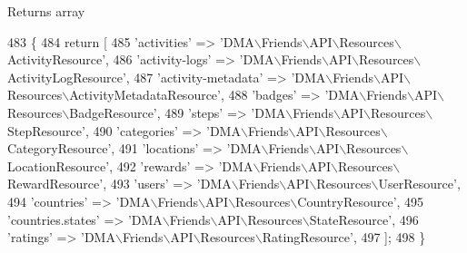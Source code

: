 \begin{DoxyReturn}{Returns}
array 
\end{DoxyReturn}

\begin{DoxyCode}
483     \{
484         \textcolor{keywordflow}{return} [
485             \textcolor{stringliteral}{'activities'}            => \textcolor{stringliteral}{'DMA\(\backslash\)Friends\(\backslash\)API\(\backslash\)Resources\(\backslash\)ActivityResource'},
486             \textcolor{stringliteral}{'activity-logs'}         => \textcolor{stringliteral}{'DMA\(\backslash\)Friends\(\backslash\)API\(\backslash\)Resources\(\backslash\)ActivityLogResource'},
487             \textcolor{stringliteral}{'activity-metadata'}     => \textcolor{stringliteral}{'DMA\(\backslash\)Friends\(\backslash\)API\(\backslash\)Resources\(\backslash\)ActivityMetadataResource'},
488             \textcolor{stringliteral}{'badges'}                => \textcolor{stringliteral}{'DMA\(\backslash\)Friends\(\backslash\)API\(\backslash\)Resources\(\backslash\)BadgeResource'},
489             \textcolor{stringliteral}{'steps'}                 => \textcolor{stringliteral}{'DMA\(\backslash\)Friends\(\backslash\)API\(\backslash\)Resources\(\backslash\)StepResource'},
490             \textcolor{stringliteral}{'categories'}            => \textcolor{stringliteral}{'DMA\(\backslash\)Friends\(\backslash\)API\(\backslash\)Resources\(\backslash\)CategoryResource'},
491             \textcolor{stringliteral}{'locations'}             => \textcolor{stringliteral}{'DMA\(\backslash\)Friends\(\backslash\)API\(\backslash\)Resources\(\backslash\)LocationResource'},
492             \textcolor{stringliteral}{'rewards'}               => \textcolor{stringliteral}{'DMA\(\backslash\)Friends\(\backslash\)API\(\backslash\)Resources\(\backslash\)RewardResource'},
493             \textcolor{stringliteral}{'users'}                 => \textcolor{stringliteral}{'DMA\(\backslash\)Friends\(\backslash\)API\(\backslash\)Resources\(\backslash\)UserResource'},
494             \textcolor{stringliteral}{'countries'}             => \textcolor{stringliteral}{'DMA\(\backslash\)Friends\(\backslash\)API\(\backslash\)Resources\(\backslash\)CountryResource'},   
495             \textcolor{stringliteral}{'countries.states'}      => \textcolor{stringliteral}{'DMA\(\backslash\)Friends\(\backslash\)API\(\backslash\)Resources\(\backslash\)StateResource'},
496             \textcolor{stringliteral}{'ratings'}               => \textcolor{stringliteral}{'DMA\(\backslash\)Friends\(\backslash\)API\(\backslash\)Resources\(\backslash\)RatingResource'},
497         ];
498     \}
\end{DoxyCode}
\hypertarget{classDMA_1_1Friends_1_1Plugin_aee1fcfd6978df90e396e75223e24080a}{}

